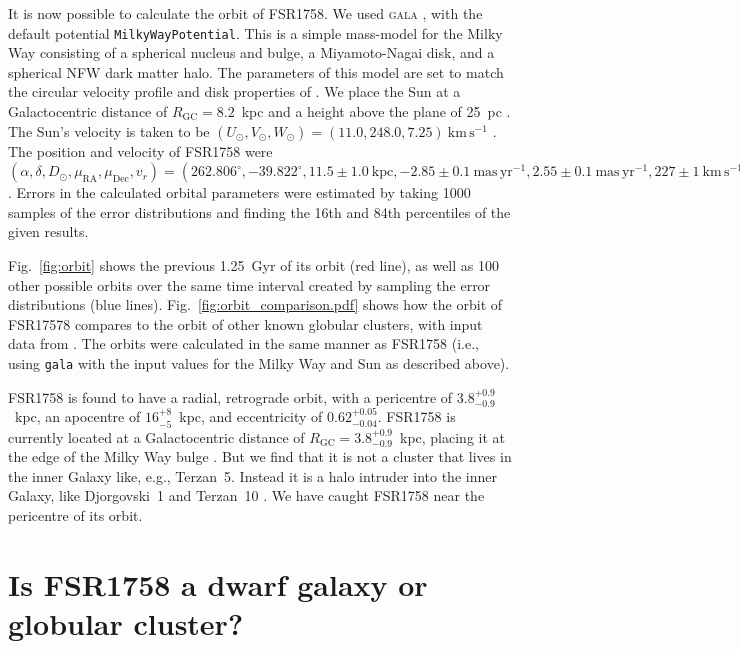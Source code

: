 \documentclass[fleqn,usenatbib]{mnras}
\newcommand{\kms}{\ensuremath{\textrm{km}\,\textrm{s}^{-1}}}
\newcommand{\masyr}{\ensuremath{\textrm{mas}\,\textrm{yr}^{-1}}}
\begin{document}
It is now possible to calculate the orbit of FSR1758. We used \textsc{gala} \citep[version 0.3;][]{Price-Whelan2017a,Price-Whelan2018b}, with the default potential \texttt{MilkyWayPotential}. This is a simple mass-model for the Milky Way consisting of a spherical nucleus and bulge, a Miyamoto-Nagai disk, and a spherical NFW dark matter halo. The parameters of this model are set to match the circular velocity profile and disk properties of \citet{Bovy:2015gg}. We place the Sun at a Galactocentric distance of $R_\mathrm{GC}=8.2$~kpc and a height above the plane of 25~pc \citep{BlandHawthorn:2016iq}. The Sun's velocity is taken to be $(U_\odot,V_\odot,W_\odot)=(11.0,248.0,7.25)~\kms$ \citep{Schonrich2012}. The position and velocity of FSR1758 were $(\alpha,\delta,D_\odot,\mu_\mathrm{RA},\mu_\mathrm{Dec},v_r)=(262.806^\circ,-39.822^\circ,11.5\pm1.0~\mathrm{kpc},-2.85\pm0.1~\mathrm{\masyr},2.55\pm0.1~\mathrm{\masyr},227\pm1~\mathrm{\kms})$. Errors in the calculated orbital parameters were estimated by taking 1000 samples of the error distributions and finding the 16th and 84th percentiles of the given results.

Fig.\ \ref{fig:orbit} shows the previous 1.25~Gyr of its orbit (red line), as well as 100 other possible orbits over the same time interval created by sampling the error distributions (blue lines). Fig.\ \ref{fig:orbit_comparison.pdf} shows how the orbit of FSR17578 compares to the orbit of other known globular clusters, with input data from \citet{Vasiliev:2018uf}. The orbits were calculated in the same manner as FSR1758 (i.e., using \texttt{gala} with the input values for the Milky Way and Sun as described above).

FSR1758 is found to have a radial, retrograde orbit, with a pericentre of $3.8_{-0.9}^{+0.9}$~kpc, an apocentre of $16_{-5}^{+8}$~kpc, and eccentricity of $0.62_{-0.04}^{+0.05}$.  FSR1758 is currently located at a Galactocentric distance of $R_\mathrm{GC} = 3.8_{-0.9}^{+0.9}$~kpc, placing it at the edge of the Milky Way bulge \citep[clusters within $\sim3$~kpc of the Galactic centre tend to be classified as `bulge' clusters;][]{Barbuy2018}. But we find that it is not a cluster that lives in the inner Galaxy like, e.g., Terzan~5. Instead it is a halo intruder into the inner Galaxy, like Djorgovski~1 and Terzan~10 \citep{Ortolani2019}. We have caught FSR1758 near the pericentre of its orbit.

\section{Is FSR1758 a dwarf galaxy or globular cluster?}\label{sec:halo}
\end{document}
